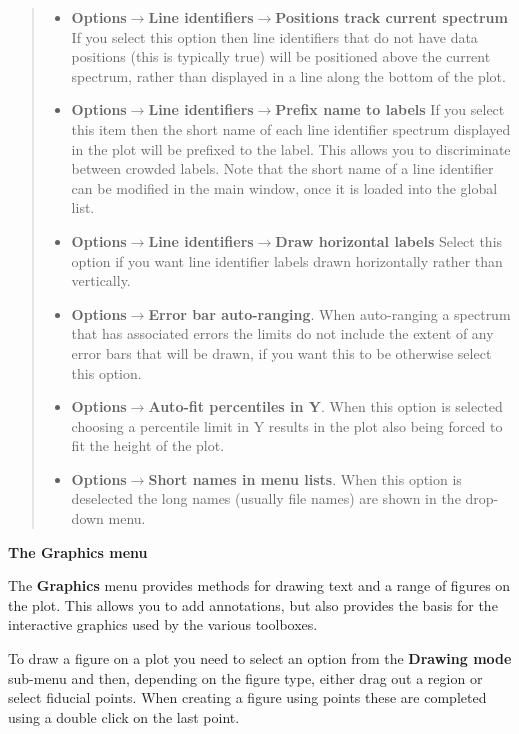 \documentclass[twoside,11pt]{article}
\newcommand{\latexhtml}[2]{#1}
\renewcommand{\_}{\texttt{\symbol{95}}}
\newcommand{\menuitem}[1]{\textbf{#1}}
\newcommand{\submenuitem}[2]{\latexhtml{\textbf{#1$\rightarrow$#2}}{\textbf{#1->#2}}}
\newcommand{\subsubmenuitem}[3]{\latexhtml{\textbf{#1$\rightarrow$#2$\rightarrow$#3}}{\textbf{#1->#2->#3}}}
\newcommand{\subheading}[1]{\textbf{\large{#1}}}
\begin{document}
\begin{quote}
\begin{itemize}
  \item \subsubmenuitem{Options}{Line identifiers}{Positions track current spectrum}
  If you select this option then line identifiers that do not have data
  positions (this is typically true) will be positioned above the current
  spectrum, rather than displayed in a line along the bottom of the plot.

  \item \subsubmenuitem{Options}{Line identifiers}{Prefix name to labels}
  If you select this item then the short name of each line identifier spectrum
  displayed in the plot will be prefixed to the label. This allows you to
  discriminate between crowded labels. Note that the short name of a line
  identifier can be modified in the main window, once it is loaded into the
  global list.

  \item \subsubmenuitem{Options}{Line identifiers}{Draw horizontal labels}
  Select this option if you want line identifier labels drawn horizontally
  rather than vertically.

  \item \submenuitem{Options}{Error bar auto-ranging}. When auto-ranging a
  spectrum that has associated errors the limits do not include the extent of
  any error bars that will be drawn, if you want this to be otherwise select
  this option.

  \item \submenuitem{Options}{Auto-fit percentiles in Y}. When this option is
  selected choosing a percentile limit in Y results in the plot also being
  forced to fit the height of the plot.

  \item \submenuitem{Options}{Short names in menu lists}. When this option is
  deselected the long names (usually file names) are shown in the
  \label{Displaying:} drop-down menu.

 \end{itemize}
\end{quote}

\subheading{The Graphics menu}

The \menuitem{Graphics} menu provides methods for drawing text and a range of
figures on the plot. This allows you to add annotations, but also provides the
basis for the interactive graphics used by the various toolboxes.

To draw a figure on a plot you need to select an option from the
\menuitem{Drawing mode} sub-menu and then, depending on the figure type, either
drag out a region or select fiducial points. When creating a figure using
points these are completed using a double click on the last point.
\end{document}
